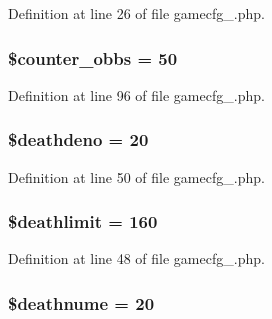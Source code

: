 Definition at line 26 of file gamecfg\+\_.\+php.

\hypertarget{gamecfg__1_8php_a81eebe5aca6408cce5219624c52f7f86}{
\subsubsection[{\$counter\+\_\+obbs}]{\setlength{\rightskip}{0pt plus 5cm}\$counter\+\_\+obbs = 50}}\label{gamecfg__1_8php_a81eebe5aca6408cce5219624c52f7f86}


Definition at line 96 of file gamecfg\+\_.\+php.

\hypertarget{gamecfg__1_8php_a1f004a4244505024ce471521d7172386}{
\subsubsection[{\$deathdeno}]{\setlength{\rightskip}{0pt plus 5cm}\$deathdeno = 20}}\label{gamecfg__1_8php_a1f004a4244505024ce471521d7172386}


Definition at line 50 of file gamecfg\+\_.\+php.

\hypertarget{gamecfg__1_8php_aa436ad48c513c90b05fe82b37b67424e}{
\subsubsection[{\$deathlimit}]{\setlength{\rightskip}{0pt plus 5cm}\$deathlimit = 160}}\label{gamecfg__1_8php_aa436ad48c513c90b05fe82b37b67424e}


Definition at line 48 of file gamecfg\+\_.\+php.

\hypertarget{gamecfg__1_8php_aa9306e2b6ffa564c3d076cd29d2650dc}{
\subsubsection[{\$deathnume}]{\setlength{\rightskip}{0pt plus 5cm}\$deathnume = 20}}\label{gamecfg__1_8php_aa9306e2b6ffa564c3d076cd29d2650dc}


